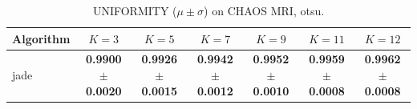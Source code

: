 \begin{table}[htbp]
\centering
\caption{UNIFORMITY ($\mu \pm \sigma$) on CHAOS MRI, otsu.}
\label{tab:exp2-otsu-uniformity}
\begin{tabular}{lcccccc}
\toprule
Algorithm & $K=3$ & $K=5$ & $K=7$ & $K=9$ & $K=11$ & $K=12$ \\
\midrule
jade & \textbf{0.9900 $\pm$ 0.0020} & \textbf{0.9926 $\pm$ 0.0015} & \textbf{0.9942 $\pm$ 0.0012} & \textbf{0.9952 $\pm$ 0.0010} & \textbf{0.9959 $\pm$ 0.0008} & \textbf{0.9962 $\pm$ 0.0008} \\
\bottomrule
\end{tabular}
\end{table}